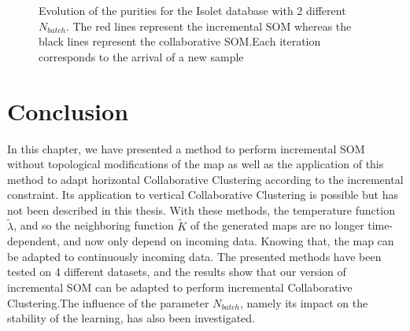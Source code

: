 \begin{figure}[!h]
					\caption{Evolution of the purities for the Isolet database with 2 different $N_{batch}$. The red lines represent the incremental SOM whereas the black lines represent the collaborative SOM.\@ Each iteration corresponds to the arrival of a new sample}
\label{fig:isom}
				\end{figure}

	\section{Conclusion}
\label{conclusion}
	In this chapter, we have presented a method to perform incremental SOM without topological modifications of the map as well as the application of this method to adapt horizontal Collaborative Clustering according to the incremental constraint. Its application to vertical Collaborative Clustering is possible but has not been described in this thesis. With these methods, the temperature function $\widetilde{\lambda}$, and so the neighboring function $\widetilde{K}$ of the generated maps are no longer time-dependent, and now only depend on incoming data. Knowing that, the map can be adapted to continuously incoming data. The presented methods have been tested on 4 different datasets, and the results show that our version of incremental SOM can be adapted to perform incremental Collaborative Clustering.\@ The influence of the parameter $N_{batch}$, namely its impact on the stability of the learning, has also been investigated.
	
